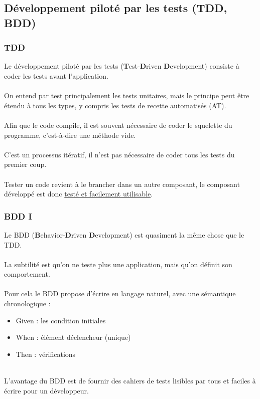 \subsection{D\'{e}veloppement pilot\'{e} par les tests (TDD, BDD)}
\begin{frame}
	\frametitle{TDD}
    Le d\'{e}veloppement pilot\'{e} par les tests (\textbf{T}est-\textbf{D}riven \textbf{D}evelopment) consiste \`{a} coder les tests avant l'application.
    \\~\\
    On entend par test principalement les tests unitaires, mais le principe peut \^{e}tre \'{e}tendu \`{a} tous les types, y compris les tests de recette automatis\'{e}s (AT).
    \\~\\
    Afin que le code compile, il est souvent n\'{e}cessaire de coder le squelette du programme, c'est-\`{a}-dire une m\'{e}thode vide.
    \\~\\
    C'est un processus it\'{e}ratif, il n'est pas n\'{e}cessaire de coder tous les tests du premier coup.
    \\~\\
    Tester un code revient \`{a} le brancher dans un autre composant, le composant d\'{e}velopp\'{e} est donc \underline{test\'{e} et facilement utilisable}.
\end{frame}

\begin{frame}
	\frametitle{BDD I}
    Le BDD (\textbf{B}ehavior-\textbf{D}riven \textbf{D}evelopment) est quasiment la m\^{e}me chose que le TDD.
    \\~\\
    La subtilit\'{e} est qu'on ne teste plus une application, mais qu'on d\'{e}finit son comportement.
    \\~\\
    Pour cela le BDD propose d'\'{e}crire en langage naturel, avec une s\'{e}mantique chronologique :
    \begin{itemize}
    	\item Given : les condition initiales
        \item When : \'{e}l\'{e}ment d\'{e}clencheur (unique)
        \item Then : v\'{e}rifications
    \end{itemize}
	~\\
	L'avantage du BDD est de fournir des cahiers de tests lisibles par tous et faciles \`{a} \'{e}crire pour un d\'{e}veloppeur.
\end{frame}

